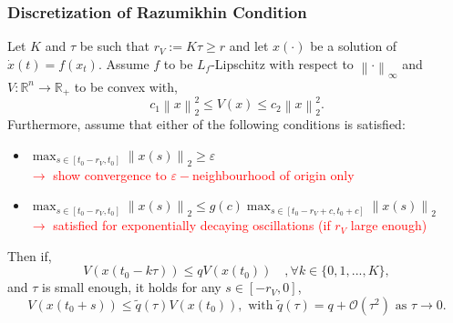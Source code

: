 \documentclass[11pt,aspectratio=169]{beamer}
\newcommand{\norm}[1]{\left\lVert#1\right\rVert}
\newcommand{\R}{\mathbb{R}}
\begin{document}
\begin{frame}[t]
    \frametitle{Discretization of Razumikhin Condition} 
Let $K$ and $\tau$ be such that $r_V:=K\tau\geq r$ and let $x(\cdot)$ be a solution of $\dot{x}(t)=f(x_t)$. Assume $f$ to be $L_f$-Lipschitz with respect to $\norm{\cdot}_\infty$ and $V:\R^n\to\R_+$ to be convex with,
$$c_1 \norm{x}_2^2 \leq V(x) \leq c_2 \norm{x}_2^2.$$ Furthermore, assume that either of the following conditions is satisfied:
\begin{itemize}
    \item  $\max_{s\in[t_0-r_V,t_0]} \norm{x(s)}_2 \geq \varepsilon$\\\vspace{0.1cm}
    \textcolor{red}{$\to$ show convergence to $\varepsilon-$neighbourhood of origin only}\vspace{0.1cm}
    \item $\max_{s\in[t_0-r_V,t_0]} \norm{x(s)}_2 \leq g(c)\max_{s\in[t_0-r_V+c,t_0+c]}\norm{x(s)}_2$ \\\vspace{0.1cm}
    \textcolor{red}{$\to$ satisfied for exponentially decaying oscillations (if $r_V$ large enough)}
\end{itemize}
Then if,
\begin{equation*}
    V(x(t_0-k\tau))\leq q V(x(t_0)) \quad,\forall k\in \lbrace 0,1,...,K \rbrace,\label{eq:DiscRazConProp}
\end{equation*}
and $\tau$ is small enough, it holds for any $s\in[-r_V,0]$,
\begin{equation*}
    V(x(t_0+s))\leq \tilde{q}(\tau)V(x(t_0)),
    \text{ with } \tilde{q}(\tau)= q+\mathcal{O}(\tau^2) \text{ as } \tau\to 0.
\end{equation*}
\end{frame}

\end{document}
